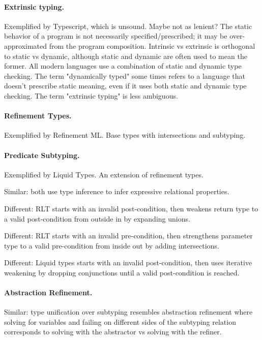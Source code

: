 \documentclass[acmsmall]{acmart}
\theoremstyle{definition}
\begin{document}
\paragraph{Extrinsic typing.}
Exemplified by Typescript, which is unsound. Maybe not as lenient?  
The static behavior of a program is not necessarily specified/prescribed; 
it may be over-approximated from the program composition. 
Intrinsic vs extrinsic is orthogonal to static vs dynamic, although static and dynamic are often used to mean the former.
All modern languages use a combination of static and dynamic type checking.
The term "dynamically typed" some times refers to a language that doesn't prescribe static meaning,
even if it uses both static and dynamic type checking. The term "extrinsic typing" is less ambiguous.

\paragraph{Refinement Types.}
Exemplified by Refinement ML. Base types with intersections and subtyping.

\paragraph{Predicate Subtyping.}
Exemplified by Liquid Types. An extension of refinement types.

Similar: both use type inference to infer expressive relational properties. 

Different: RLT starts with an invalid post-condition, then weakens return type to a valid post-condition from outside in by expanding unions.

Different: RLT starts with an invalid pre-condition, then strengthens parameter type to a valid pre-condition from inside out by adding intersections.

Different: Liquid types starts with an invalid post-condition, then uses iterative weakening by dropping conjunctions until a valid post-condition is reached.


\paragraph{Abstraction Refinement.} 
Similar: type unification over subtyping resembles abstraction refinement  
where solving for variables and failing on different sides of the subtyping relation corresponds to
solving with the abstractor vs solving with the refiner.
\end{document}
